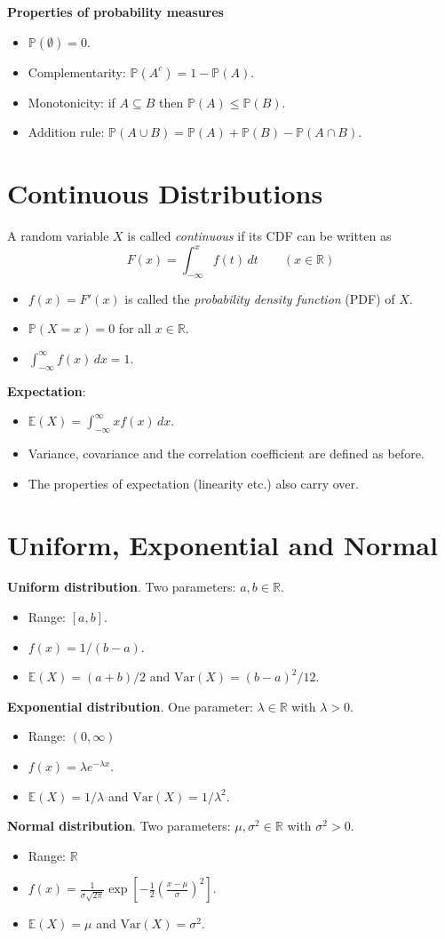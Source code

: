 \documentclass[lecture]{csm}
\newcommand{\prob}{\mathbb{P}}
\newcommand{\expe}{\mathbb{E}}
\newcommand{\var}{\text{Var}}
\newcommand{\R}{\mathbb{R}}
\def\it{\item}
\def\bit{\begin{itemize}}
\def\eit{\end{itemize}}
\begin{document}
\vspace*{1ex}
\textbf{Properties of probability measures}
\bit
\it $\prob(\emptyset) = 0$.
\it Complementarity: $\prob(A^c) = 1 - \prob(A)$.
\it Monotonicity: if $A\subseteq B$ then $\prob(A)\leq \prob(B)$.
\it Addition rule: $\prob(A\cup B) = \prob(A) + \prob(B) - \prob(A\cap B)$.
\eit
\newpage
\section{Continuous Distributions}
A random variable $X$ is called \emph{continuous} if its CDF can be written as 
\[
F(x) = \int_{-\infty}^x f(t)\,dt\qquad (x\in\R)
\]
\bit
\it $f(x) = F'(x)$ is called the \emph{probability density function} (PDF) of $X$.
\it $\prob(X=x)=0$ for all $x\in\R$.
\it $\displaystyle\int_{-\infty}^{\infty} f(x)\,dx = 1$.
\eit

\vspace*{1ex}
\textbf{Expectation}:
\bit
\it $\expe(X) = \displaystyle\int_{-\infty}^{\infty} x f(x)\,dx$.
\eit

\bit
\it Variance, covariance and the correlation coefficient are defined as before.
\it The properties of expectation (linearity etc.) also carry over.
\eit

\newpage
\section{Uniform, Exponential and Normal}
\textbf{Uniform distribution}. Two parameters: $a,b\in\R$.
\bit
\it Range: $[a,b]$.
\it $f(x) = 1/(b-a)$.
\it $\expe(X) = (a+b)/2$ and $\var(X) = (b-a)^2/12$.
\eit
\vspace*{1ex}
\textbf{Exponential distribution}. One parameter: $\lambda\in\R$ with $\lambda>0$.
\bit
\it Range: $(0,\infty)$
\it $f(x) = \lambda e^{-\lambda x}$.
\it $\expe(X) = 1/\lambda$ and $\var(X) = 1/\lambda^2$.
\eit
\vspace*{1ex}
\textbf{Normal distribution}. Two parameters: $\mu,\sigma^2\in\R$ with $\sigma^2 > 0$.
\bit
\it Range: $\R$
\it $f(x) = \displaystyle\frac{1}{\sigma\sqrt{2\pi}}\exp\left[-\frac{1}{2}\left(\frac{x-\mu}{\sigma}\right)^2\right]$.
\it $\expe(X) = \mu$ and $\var(X) = \sigma^2$.
\eit
\newpage
\end{document}
